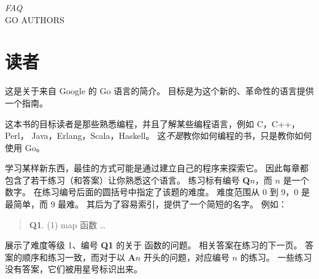 {\textit{FAQ}\\ \textsc{GO AUTHORS}}

\section{读者}
\noindent{}这是关于来自 Google 的 Go 语言的简介。
目标是为这个新的、革命性的语言提供一个指南。

这本书的目标读者是那些熟悉编程，并且了解某些编程语言，例如 C\cite{c}，C++\cite{c++}，\\ 
Perl\cite{perl}， Java\cite{java}，Erlang\cite{erlang}，Scala\cite{scala}，Haskell\cite{haskell}。
这\emph{不是}教你如何编程的书，只是教你如何使用 Go。

学习某样新东西，最佳的方式可能是通过建立自己的程序来探索它。
因此每章都包含了若干练习（和答案）让你熟悉这个语言。
练习标有编号 \textbf{Q$n$}，而  $n$ 是一个数字。 
在练习编号后面的圆括号中指定了该题的难度。
难度范围从 0 到 9，0 是最简单，而 9 最难。
其后为了容易索引，提供了一个简短的名字。
例如：
\begin{verse}
\textbf{Q1}. (1) map 函数 \ldots
\end{verse}
展示了难度等级 1、编号 \textbf{Q1} 的关于  函数的问题。
相关答案在练习的下一页。
答案的顺序和练习一致，而对于以 \textbf{A$n$} 开头的问题，对应编号 $n$ 的练习。
一些练习没有答案，它们被用星号标识出来。

